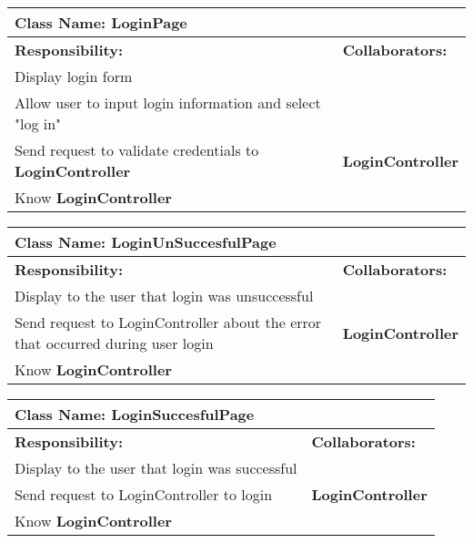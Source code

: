 \documentclass[]{article}
\begin{document}
   \begin{table}[H]
        \centering
        \begin{tabular}{|p{5cm}|p{5cm}|}
        \hline 
         \multicolumn{2}{|l|}{\textbf{Class Name:} LoginPage} \\
        \hline
        \textbf{Responsibility:} & \textbf{Collaborators:} \\
        \hline
        Display login form &  \phantom{} \\
        \hline
        Allow user to input login information and select "log in" & \phantom{} \\
        \hline
        Send request to validate credentials to \textbf{LoginController} & \textbf{LoginController} \\
        \hline
        Know \textbf{LoginController} & \phantom{} \\
        \hline
        \end{tabular}
    \end{table}

    \begin{table}[H]
        \centering
        \begin{tabular}{|p{5cm}|p{5cm}|}
        \hline 
         \multicolumn{2}{|l|}{\textbf{Class Name:} LoginUnSuccesfulPage} \\
        \hline
        \textbf{Responsibility:} & \textbf{Collaborators:} \\
        \hline
        Display to the user that login was unsuccessful &  \phantom{} \\
        \hline
        Send request to LoginController about the error that occurred during user  login &  \textbf{LoginController}
      \phantom{} \\
        \hline
        Know \textbf{LoginController} & \phantom{} \\
        \hline
        
        \end{tabular}
    \end{table}

    \begin{table}[H]
        \centering
        \begin{tabular}{|p{5cm}|p{5cm}|}
        \hline 
         \multicolumn{2}{|l|}{\textbf{Class Name:} LoginSuccesfulPage} \\
        \hline
        \textbf{Responsibility:} & \textbf{Collaborators:} \\
        \hline
        Display to the user that login was successful &  \phantom{} \\
        \hline
        Send request to LoginController to login &  \textbf{LoginController}
      \phantom{} \\
        \hline
        Know \textbf{LoginController} & \phantom{} \\
        \hline
        
        \end{tabular}
    \end{table}
\end{document}
